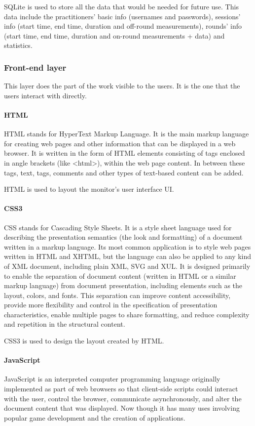 \documentclass[a4paper]{article}
\begin{document}
SQLite is used to store all the data that would be needed for future use. This data include the practitioners' basic info (usernames and passwords), sessions' info (start time, end time, duration and off-round measurements), rounds' info (start time, end time, duration and on-round measurements + data) and statistics.

\subsubsection{Front-end layer}
This layer does the part of the work visible to the users. It is the one that the users interact with directly.

\paragraph{HTML}
HTML stands for HyperText Markup Language. It is the main markup language for creating web pages and other information that can be displayed in a web browser. It is written in the form of HTML elements consisting of tags enclosed in angle brackets (like <html>), within the web page content. In between these tags, text, tags, comments and other types of text-based content can be added.

HTML is used to layout the monitor's user interface UI.

\newpage

\paragraph{CSS3}
CSS stands for Cascading Style Sheets. It is a style sheet language used for describing the presentation semantics (the look and formatting) of a document written in a markup language. Its most common application is to style web pages written in HTML and XHTML, but the language can also be applied to any kind of XML document, including plain XML, SVG and XUL. It is designed primarily to enable the separation of document content (written in HTML or a similar markup language) from document presentation, including elements such as the layout, colors, and fonts. This separation can improve content accessibility, provide more flexibility and control in the specification of presentation characteristics, enable multiple pages to share formatting, and reduce complexity and repetition in the structural content.

CSS3 is used to design the layout created by HTML.

\paragraph{JavaScript}
JavaScript is an interpreted computer programming language originally implemented as part of web browsers so that client-side scripts could interact with the user, control the browser, communicate asynchronously, and alter the document content that was displayed. Now though it has many uses involving popular game development and the creation of applications.
\end{document}
